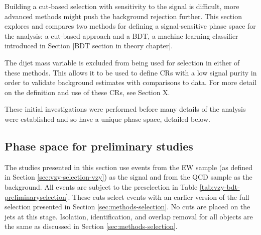 Building a cut-based selection with sensitivity to the signal is difficult, more
advanced methods might push the background rejection further. This section
explores and compares two methods for defining a signal-sensitive phase space
for the analysis: a cut-based approach and a \ac{BDT}, a machine learning
classifier introduced in Section [BDT section in theory chapter]. %

The dijet mass variable is excluded from being used for selection in either of
these methods. This allows it to be used to define \acp{CR} with a low signal
purity in order to validate background estimates with comparisons to data. For
more detail on the definition and use of these \acp{CR}, see Section X. %

These initial investigations were performed before many details of the analysis
were established and so have a unique phase space, detailed below.

\subsection{Phase space for preliminary studies}

The studies presented in this section use events from the \ac{EW} \VZy sample
(as defined in Section \ref{sec:vzy-selection-vzy}) as the signal and from the
\ac{QCD} \Zy sample as the background. All events are subject to the
preselection in Table \ref{tab:vzy-bdt-preliminaryselection}.  These cuts select
\Zy events with an earlier version of the full \Zy selection presented in
Section \ref{sec:methods-selection}.  No cuts are placed on the jets at this
stage.  Isolation, identification, and overlap removal for all objects are the
same as discussed in Section \ref{sec:methods-selection}.

